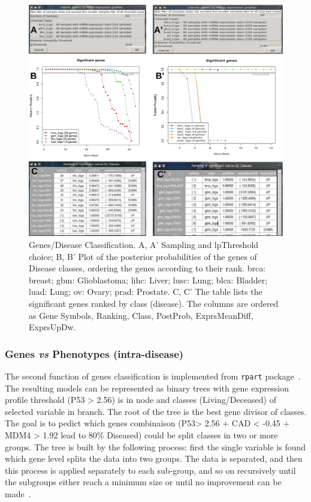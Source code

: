 \documentclass[a4paper]{article}
\begin{document}
 \begin{figure}[!ht]
  \centering
 \includegraphics[scale=2]{image/GenesClass.png}
 \caption{Genes/Disease Classification. A, A' Sampling and lpThreshold choice; B, B' Plot of the posterior probabilities of the genes of Disease classes, ordering the genes according to their rank. brca: breast; gbm: Glioblastoma; lihc: Liver; lusc: Lung; blca: Bladder; luad: Lung; ov: Ovary; prad: Prostate. C, C' The table lists the significant genes ranked by class (disease). The columns are ordered as Gene Symbols, Ranking, Class, PostProb, ExprsMeanDiff, ExprsUpDw.
 }
 \label{GenesClass}
 \end{figure}

\newpage

\subsubsection{Genes \emph{vs} Phenotypes (intra-disease)}

The second function of genes classification is implemented from \texttt{rpart} package~\cite{Therneau2014}. The resulting models can be represented as binary trees with gene expression profile threshold (P53 > 2.56) is in node and classes (Living/Deceased) of selected variable in branch. The root of the tree is the best gene divisor of classes. The goal is to pedict which genes combinaison (P53> 2.56 + CAD < -0.45 + MDM4 > 1.92 lead to 80\% Diseased) could be split classes in two or more groups.
The tree is built by the following process: first the single variable is found which gene level splits the data into two groups. The data is separated, and then this process is applied separately to each sub-group, and so on recursively until the subgroups either reach a minimum size or until no improvement can be made~\cite{Therneau2014}.
\end{document}
